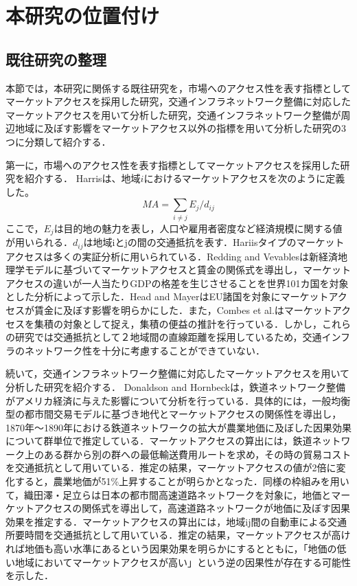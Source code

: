 \chapter{本研究の位置付け}

\section{既往研究の整理}
本節では，本研究に関係する既往研究を，市場へのアクセス性を表す指標としてマーケットアクセスを採用した研究，交通インフラネットワーク整備に対応したマーケットアクセスを用いて分析した研究，交通インフラネットワーク整備が周辺地域に及ぼす影響をマーケットアクセス以外の指標を用いて分析した研究の3つに分類して紹介する．

第一に，市場へのアクセス性を表す指標としてマーケットアクセスを採用した研究を紹介する．
Harris\cite{harrisc1954}は、地域$i$におけるマーケットアクセスを次のように定義した。
\[ MA = \sum_{i \neq j}{E_{j}/d_{ij}}\]
ここで，$E_{j}$は目的地の魅力を表し，人口や雇用者密度など経済規模に関する値が用いられる．$d_{ij}$は地域iとjの間の交通抵抗を表す．Hariisタイプのマーケットアクセスは多くの実証分析に用いられている．Redding and Vevables\cite{redding2004}は新経済地理学モデルに基づいてマーケットアクセスと賃金の関係式を導出し，マーケットアクセスの違いが一人当たりGDPの格差を生じさせることを世界101カ国を対象とした分析によって示した．Head and Mayer\cite{head2006}はEU諸国を対象にマーケットアクセスが賃金に及ぼす影響を明らかにした．また，Combes et al.\cite{combes2010}はマーケットアクセスを集積の対象として捉え，集積の便益の推計を行っている．しかし，これらの研究では交通抵抗として２地域間の直線距離を採用しているため，交通インフラのネットワーク性を十分に考慮することができていない．
 
続いて，交通インフラネットワーク整備に対応したマーケットアクセスを用いて分析した研究を紹介する．
Donaldson and Hornbeck\cite{donaldson2016}は，鉄道ネットワーク整備がアメリカ経済に与えた影響について分析を行っている．具体的には，一般均衡型の都市間交易モデルに基づき地代とマーケットアクセスの関係性を導出し，1870年〜1890年における鉄道ネットワークの拡大が農業地価に及ぼした因果効果について群単位で推定している．マーケットアクセスの算出には，鉄道ネットワーク上のある群から別の群への最低輸送費用ルートを求め，その時の貿易コストを交通抵抗として用いている．推定の結果，マーケットアクセスの値が2倍に変化すると，農業地価が51\%上昇することが明らかとなった．同様の枠組みを用いて，織田澤・足立ら\cite{otazawa2022}は日本の都市間高速道路ネットワークを対象に，地価とマーケットアクセスの関係式を導出して，高速道路ネットワークが地価に及ぼす因果効果を推定する．マーケットアクセスの算出には，地域ij間の自動車による交通所要時間を交通抵抗として用いている．推定の結果，マーケットアクセスが高ければ地価も高い水準にあるという因果効果を明らかにするとともに，「地価の低い地域においてマーケットアクセスが高い」という逆の因果性が存在する可能性を示した．

